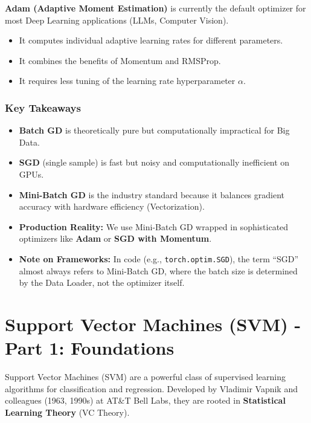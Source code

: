 \documentclass[
  italian,
  11pt,
]{article}
\begin{document}
\textbf{Adam (Adaptive Moment Estimation)} is currently the default
optimizer for most Deep Learning applications (LLMs, Computer Vision).

\begin{itemize}
\item
  It computes individual adaptive learning rates for different
  parameters.
\item
  It combines the benefits of Momentum and RMSProp.
\item
  It requires less tuning of the learning rate hyperparameter
  \(\alpha\).
\end{itemize}

\subsubsection{Key Takeaways}\label{key-takeaways-14}

\begin{itemize}
\item
  \textbf{Batch GD} is theoretically pure but computationally
  impractical for Big Data.
\item
  \textbf{SGD} (single sample) is fast but noisy and computationally
  inefficient on GPUs.
\item
  \textbf{Mini-Batch GD} is the industry standard because it balances
  gradient accuracy with hardware efficiency (Vectorization).
\item
  \textbf{Production Reality:} We use Mini-Batch GD wrapped in
  sophisticated optimizers like \textbf{Adam} or \textbf{SGD with
  Momentum}.
\item
  \textbf{Note on Frameworks:} In code (e.g., \texttt{torch.optim.SGD}),
  the term ``SGD'' almost always refers to Mini-Batch GD, where the
  batch size is determined by the Data Loader, not the optimizer itself.

  \newpage
\end{itemize}

\section{Support Vector Machines (SVM) - Part 1:
Foundations}\label{support-vector-machines-svm---part-1-foundations}

Support Vector Machines (SVM) are a powerful class of supervised
learning algorithms for classification and regression. Developed by
Vladimir Vapnik and colleagues (1963, 1990s) at AT\&T Bell Labs, they
are rooted in \textbf{Statistical Learning Theory} (VC Theory).
\end{document}
